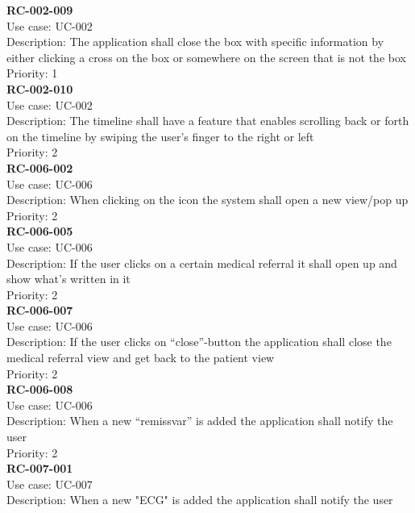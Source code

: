 \newline
\textbf{RC-002-009} \\
Use case: UC-002 \\
Description: The application shall close the box with specific information by either clicking a cross on the box or somewhere on the screen that is not the box \\
Priority: 1 \\
\newline
\textbf{RC-002-010} \\
Use case: UC-002 \\
Description: The timeline shall have a feature that enables scrolling back or forth on the timeline by swiping the user’s finger to the right or left \\
Priority: 2 \\
\newline
\textbf{RC-006-002} \\
Use case: UC-006 \\
Description: When clicking on the icon the system shall open a new view/pop up \\
Priority: 2 \\
\newline
\textbf{RC-006-005} \\
Use case: UC-006 \\
Description: If the user clicks on a certain medical referral it shall open up and show what’s written in it \\
Priority: 2 \\
\newline
\textbf{RC-006-007} \\
Use case: UC-006 \\
Description: If the user clicks on “close”-button the application shall close the medical referral view and get back to the patient view \\
Priority: 2 \\
\newline
\textbf{RC-006-008} \\
Use case: UC-006 \\
Description: When a new “remissvar” is added the application shall notify the user  \\
Priority: 2 \\
\newline
\textbf{RC-007-001} \\
Use case: UC-007 \\
Description: When a new "ECG" is added the application shall notify the user \\

